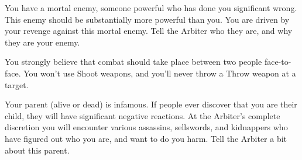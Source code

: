 {    You have a mortal enemy, someone powerful who has done you significant wrong.  This enemy should be substantially more powerful than you.  You are driven by your revenge against this mortal enemy. Tell the Arbiter who they are, and why they are your enemy.


    You strongly believe that combat should take place between two people face-to-face.  You won't use Shoot weapons, and you'll never throw a Throw weapon at a target.


    Your parent (alive or dead) is infamous.  If people ever discover that you are their child, they will have significant negative reactions.  At the Arbiter's complete discretion you will encounter various assassins, sellswords, and kidnappers who have figured out who you are, and want to do you harm.  Tell the Arbiter a bit about this parent.











    

}
